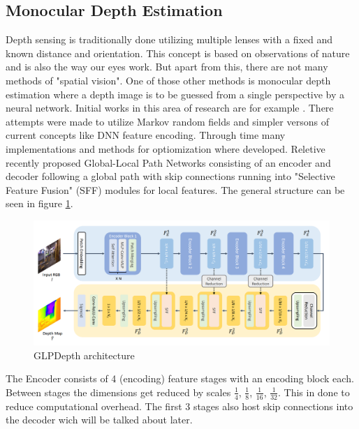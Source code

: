 \subsection*{Monocular Depth Estimation}

Depth sensing is traditionally done utilizing multiple lenses with a fixed and known distance and orientation. This concept is based on observations of nature and is also the way our eyes work.
But apart from this, there are not many methods of "spatial vision". One of those other methods is monocular depth estimation where a depth image is to be guessed from a single perspective by a neural network. Initial works in this area of research are for example 
. There attempts were made to utilize Markov random fields and simpler versons of current concepts like DNN feature encoding.
Through time many implementations and methods for optiomization where developed. Reletive recently 
proposed Global-Local Path Networks consisting of an encoder and decoder following a global path with skip connections running into "Selective Feature Fusion" (SFF) modules for local features. The general structure can be seen in figure \ref*{GLPDepth_arch}.

\begin{figure}[ht]
    \begin{center}
        \includegraphics*[scale=.22, pagebox=artbox]{resources/GLPDepth.png}
        \caption{GLPDepth architecture} \label{GLPDepth_arch}
    \end{center}
\end{figure}

The Encoder consists of 4 (encoding) feature stages with an encoding block each. Between stages the dimensions get reduced by scales $\frac{1}{4}$, $\frac{1}{8}$, $\frac{1}{16}$, $\frac{1}{32}$. This in done to reduce computational overhead. The first 3 stages also host skip connections into the decoder wich will be talked about later.

